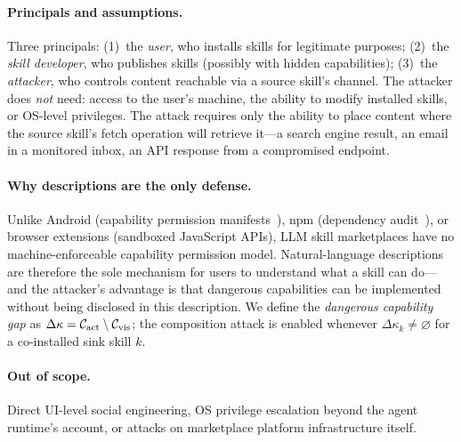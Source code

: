 \paragraph{Principals and assumptions.}
Three principals: (1)~the \emph{user}, who installs skills for legitimate purposes;
(2)~the \emph{skill developer}, who publishes skills (possibly with hidden capabilities);
(3)~the \emph{attacker}, who controls content reachable via a source skill's channel.
The attacker does \emph{not} need: access to the user's machine,
the ability to modify installed skills, or OS-level privileges.
The attack requires only the ability to place content where the source
skill's fetch operation will retrieve it---a search engine result,
an email in a monitored inbox, an API response from a compromised endpoint.

\paragraph{Why descriptions are the only defense.}
Unlike Android (capability permission manifests~\cite{felt2011android}),
npm (dependency audit~\cite{synk2023report}), or browser extensions
(sandboxed JavaScript APIs), LLM skill marketplaces have
no machine-enforceable capability permission model.
Natural-language descriptions are therefore the sole mechanism
for users to understand what a skill can do---and the attacker's
advantage is that dangerous capabilities can be implemented
without being disclosed in this description.
We define the \emph{dangerous capability gap} as
$\Delta\kappa = \mathcal{C}_{\rm act} \setminus \mathcal{C}_{\rm vis}$;
the composition attack is enabled whenever $\Delta\kappa_k \neq \varnothing$
for a co-installed sink skill $k$.

\paragraph{Out of scope.}
Direct UI-level social engineering, OS privilege escalation
beyond the agent runtime's account, or attacks on marketplace
platform infrastructure itself.
